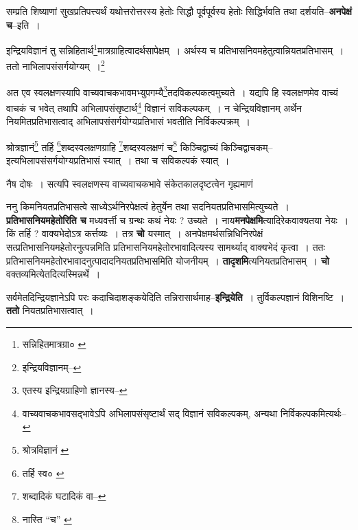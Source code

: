 \documentclass[article,12pt,a4paper]{memoir}
\begin{document}
	  \pstart सम्प्रति शिष्याणां सुखप्रतिपत्त्यर्थं यथोत्तरोत्तरस्य हेतोः सिद्धौ पूर्वपूर्वस्य हेतोः सिद्धिर्भवति तथा दर्शयति--\textbf{अनपेक्षं च}--इति ।
	\pend
      \leavevmode{}
	  \bigskip
	  \begingroup
	

	  \pstart इन्द्रियविज्ञानं तु सन्निहितार्थ\footnote{सन्निहितमात्रग्रा० \cite{dp-msA} \cite{dp-edP} \cite{dp-edH} \cite{dp-edE} \cite{dp-edN}}मात्रग्राहित्वादर्थसापेक्षम् । अर्थस्य च प्रतिभासनिवमहेतुत्वान्नियतप्रतिभासम् । ततो नाभिलापसंसर्गयोग्यम् ।\footnote{इन्द्रियविज्ञानम्--\cite{dp-msD-n}}
	\pend
       

	  \pstart अत एव स्वलक्षणस्यापि वाच्यवाचकभावमभ्युपगम्यै\footnote{एतस्य इन्द्रियग्राहिणो ज्ञानस्य--\cite{dp-msD-n}}तदविकल्पकत्वमुच्यते । यद्यपि हि स्वलक्षणमेव वाच्यं वाचकं च भवेत् तथापि अभिलापसंसृष्टार्थ\footnote{वाच्यवाचकभावसद्भावेऽपि अभिलापसंसृष्टार्थं सद् विज्ञानं सविकल्पकम्, अन्यथा निर्विकल्पकमित्यर्थः--\cite{dp-msD-n}} विज्ञानं सविकल्पकम् । न चेन्द्रियविज्ञानम् अर्थेन नियमितप्रतिभासत्वाद् अभिलापसंसर्गयोग्यप्रतिभासं भवतीति निर्विकल्पक्रम् ।
	\pend
       

	  \pstart श्रोत्रज्ञानं\footnote{श्रोत्रविज्ञानं \cite{dp-msB} \cite{dp-msD} \cite{dp-edN}} तर्हि \footnote{तर्हि स्व० \cite{dp-msB}}शब्दस्वलक्षणग्राहि \footnote{शब्दादिकं घटादिकं वा--\cite{dp-msD-n}}शब्दस्वलक्षणं च\footnote{नास्ति “च” \cite{dp-msA} \cite{dp-edP} \cite{dp-edH} \cite{dp-edE}} किञ्चिद्वाच्यं किञ्चिद्वाचकम्--इत्यभिलापसंसर्गयोग्यप्रतिभासं स्यात् । तथा च सविकल्पकं स्यात् ।
	\pend
       

	  \pstart नैष दोषः । सत्यपि स्वलक्षणस्य वाच्यवाचकभावे संकेतकालदृष्टत्वेन गृह्यमाणं
	\pend
      
	  \endgroup
	

	  \pstart ननु किमनियतप्रतिभासत्वे साध्येऽर्थनिरपेक्षत्वं हेतुर्येन तथा सदनियतप्रतिभासमित्युच्यते । \textbf{प्रतिभासनियमहेतोरिति च} मध्यवर्त्ती च ग्रन्थः कथं नेयः ? उच्यते । नाय\textbf{मनपेक्षमि}त्यादिरेकवाक्यतया नेयः । किं तर्हि ? वाक्यभेदोऽत्र कर्त्तव्यः । तत्र \textbf{चो} यस्मात् । अनपेक्षमर्थसन्निधिनिरपेक्षं सत्प्रतिभासनियमहेतोरनुत्पन्नमिति प्रतिभासनियमहेतोरभावादित्यस्य सामर्थ्याद् वाक्यभेदं कृत्वा । ततः प्रतिभासनियमहेतोरभावादनुत्पादादनियतप्रतिभासमिति योजनीयम् । \textbf{तादृशमि}त्यनियतप्रतिभासम् । \textbf{चो} वक्तव्यमित्येतदित्यस्मिन्नर्थे ।
	\pend
      

	  \pstart सर्वमेतदिन्द्रियज्ञानेऽपि परः कदाचिदाशङ्कयेदिति तन्निरासार्थमाह--\textbf{इन्द्रियेति} । तुर्विकल्पज्ञानं विशिनष्टि । \textbf{ततो} नियतप्रतिभासत्वात् ।
	\pend
      
\end{document}
